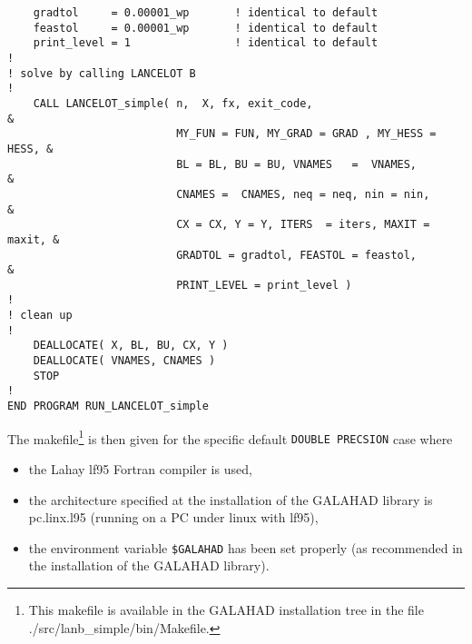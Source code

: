 \documentclass{article}
\begin{document}
\begin{lstlisting}
    gradtol     = 0.00001_wp       ! identical to default
    feastol     = 0.00001_wp       ! identical to default
    print_level = 1                ! identical to default
!
! solve by calling LANCELOT B
!
    CALL LANCELOT_simple( n,  X, fx, exit_code,                          &
                          MY_FUN = FUN, MY_GRAD = GRAD , MY_HESS = HESS, &
                          BL = BL, BU = BU, VNAMES   =  VNAMES,          &
                          CNAMES =  CNAMES, neq = neq, nin = nin,        &
                          CX = CX, Y = Y, ITERS  = iters, MAXIT = maxit, &
                          GRADTOL = gradtol, FEASTOL = feastol,          &
                          PRINT_LEVEL = print_level )
!
! clean up
!
    DEALLOCATE( X, BL, BU, CX, Y )
    DEALLOCATE( VNAMES, CNAMES )
    STOP
!
END PROGRAM RUN_LANCELOT_simple
\end{lstlisting}

\noindent
The makefile\footnote{This makefile is available
in the {\sf GALAHAD} installation tree in the file
./src/lanb\_simple/bin/Makefile.} is then given for the specific default
{\tt DOUBLE PRECSION} case where
\begin{itemize}
\item the Lahay lf95 Fortran compiler is used,
\item the architecture specified at the installation of the
{\sf GALAHAD} library is pc.linx.l95 (running on a PC under linux with lf95),
\item the environment variable {\tt \$GALAHAD} has been set properly
(as recommended in the installation of the {\sf GALAHAD} library).
\end{itemize}
\end{document}
